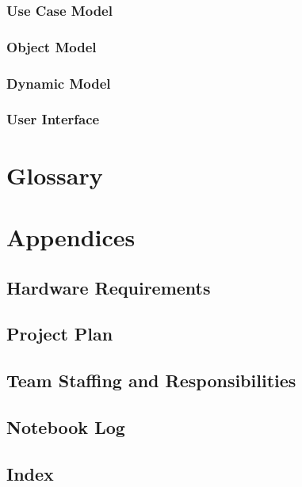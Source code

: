 \documentclass[11pt]{article}
\begin{document}
        \subsubsection{Use Case Model}

        \subsubsection{Object Model}

        \subsubsection{Dynamic Model}

        \subsubsection{User Interface}

\section{Glossary}

\section{Appendices}

    \subsection{Hardware Requirements}

    \subsection{Project Plan}

    \subsection{Team Staffing and Responsibilities}

    \subsection{Notebook Log}

    \subsection{Index}
    \printindex
    
\end{document}
